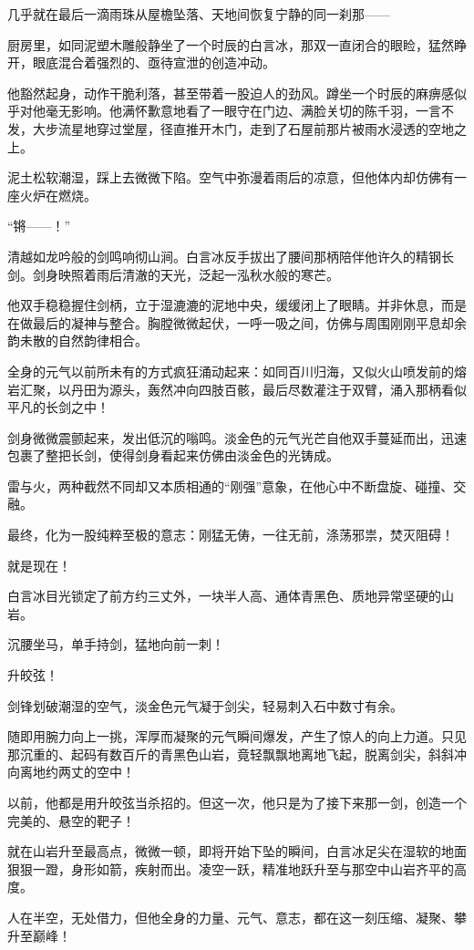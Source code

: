 几乎就在最后一滴雨珠从屋檐坠落、天地间恢复宁静的同一刹那——

厨房里，如同泥塑木雕般静坐了一个时辰的白言冰，那双一直闭合的眼睑，猛然睁开，眼底混合着强烈的、亟待宣泄的创造冲动。

他豁然起身，动作干脆利落，甚至带着一股迫人的劲风。蹲坐一个时辰的麻痹感似乎对他毫无影响。他满怀歉意地看了一眼守在门边、满脸关切的陈千羽，一言不发，大步流星地穿过堂屋，径直推开木门，走到了石屋前那片被雨水浸透的空地之上。

泥土松软潮湿，踩上去微微下陷。空气中弥漫着雨后的凉意，但他体内却仿佛有一座火炉在燃烧。

“锵——！”

清越如龙吟般的剑鸣响彻山涧。白言冰反手拔出了腰间那柄陪伴他许久的精钢长剑。剑身映照着雨后清澈的天光，泛起一泓秋水般的寒芒。

他双手稳稳握住剑柄，立于湿漉漉的泥地中央，缓缓闭上了眼睛。并非休息，而是在做最后的凝神与整合。胸膛微微起伏，一呼一吸之间，仿佛与周围刚刚平息却余韵未散的自然韵律相合。

全身的元气以前所未有的方式疯狂涌动起来：如同百川归海，又似火山喷发前的熔岩汇聚，以丹田为源头，轰然冲向四肢百骸，最后尽数灌注于双臂，涌入那柄看似平凡的长剑之中！

剑身微微震颤起来，发出低沉的嗡鸣。淡金色的元气光芒自他双手蔓延而出，迅速包裹了整把长剑，使得剑身看起来仿佛由淡金色的光铸成。

雷与火，两种截然不同却又本质相通的“刚强”意象，在他心中不断盘旋、碰撞、交融。

最终，化为一股纯粹至极的意志：刚猛无俦，一往无前，涤荡邪祟，焚灭阻碍！

就是现在！

白言冰目光锁定了前方约三丈外，一块半人高、通体青黑色、质地异常坚硬的山岩。

沉腰坐马，单手持剑，猛地向前一刺！

升皎弦！

剑锋划破潮湿的空气，淡金色元气凝于剑尖，轻易刺入石中数寸有余。

随即用腕力向上一挑，浑厚而凝聚的元气瞬间爆发，产生了惊人的向上力道。只见那沉重的、起码有数百斤的青黑色山岩，竟轻飘飘地离地飞起，脱离剑尖，斜斜冲向离地约两丈的空中！

以前，他都是用升皎弦当杀招的。但这一次，他只是为了接下来那一剑，创造一个完美的、悬空的靶子！

就在山岩升至最高点，微微一顿，即将开始下坠的瞬间，白言冰足尖在湿软的地面狠狠一蹬，身形如箭，疾射而出。凌空一跃，精准地跃升至与那空中山岩齐平的高度。

人在半空，无处借力，但他全身的力量、元气、意志，都在这一刻压缩、凝聚、攀升至巅峰！

